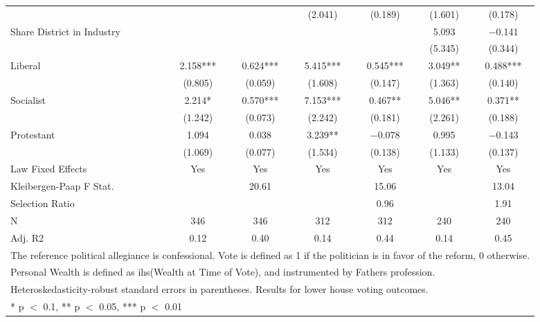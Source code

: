 \begin{table}[!h]
{\begin{tabular}[t]{lcccccc}
 &  &  & (\num{2.041}) & (\num{0.189}) & (\num{1.601}) & (\num{0.178})\\
Share District in Industry &  &  &  &  & \num{5.093} & \num{-0.141}\\
 &  &  &  &  & (\num{5.345}) & (\num{0.344})\\
Liberal & \num{2.158}*** & \num{0.624}*** & \num{5.415}*** & \num{0.545}*** & \num{3.049}** & \num{0.488}***\\
 & (\num{0.805}) & (\num{0.059}) & (\num{1.608}) & (\num{0.147}) & (\num{1.363}) & (\num{0.140})\\
Socialist & \num{2.214}* & \num{0.570}*** & \num{7.153}*** & \num{0.467}** & \num{5.046}** & \num{0.371}**\\
 & (\num{1.242}) & (\num{0.073}) & (\num{2.242}) & (\num{0.181}) & (\num{2.261}) & (\num{0.188})\\
Protestant & \num{1.094} & \num{0.038} & \num{3.239}** & \num{-0.078} & \num{0.995} & \num{-0.143}\\
 & (\num{1.069}) & (\num{0.077}) & (\num{1.534}) & (\num{0.138}) & (\num{1.133}) & (\num{0.137})\\
\midrule
Law Fixed Effects & Yes & Yes & Yes & Yes & Yes & Yes\\
Kleibergen-Paap F Stat. &  & 20.61 &  & 15.06 &  & 13.04\\
Selection Ratio &  &  &  & 0.96 &  & 1.91\\
N & \num{346} & \num{346} & \num{312} & \num{312} & \num{240} & \num{240}\\
Adj. R2 & \num{0.12} & \num{0.40} & \num{0.14} & \num{0.44} & \num{0.14} & \num{0.45}\\
\bottomrule
\multicolumn{7}{l}{\rule{0pt}{1em}The reference political allegiance is confessional. Vote is defined as 1 if the politician is in favor of the reform, 0 otherwise.}\\
\multicolumn{7}{l}{\rule{0pt}{1em}Personal Wealth is defined as ihs(Wealth at Time of Vote), and instrumented by Fathers profession.}\\
\multicolumn{7}{l}{\rule{0pt}{1em}Heteroskedasticity-robust standard errors in parentheses. Results for lower house voting outcomes.}\\
\multicolumn{7}{l}{\rule{0pt}{1em}* p $<$ 0.1, ** p $<$ 0.05, *** p $<$ 0.01}\\
\end{tabular}}
\end{table}
